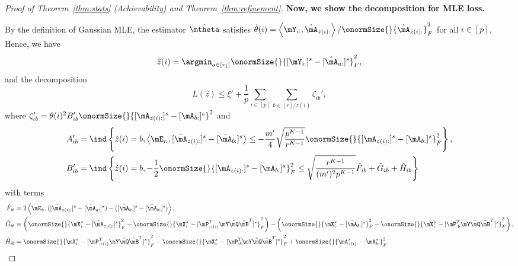 \documentclass[lettersize,onecolumn,journal]{IEEEtran}
\theoremstyle{definition}
\theoremstyle{definition}
\newcommand{\of}[1]{\left(#1\right)}
\newcommand{\offf}[1]{\left\{#1\right\}}
\newcommand{\ang}[1]{\left\langle#1\right\rangle}
\begin{document}
\begin{proof}[Proof of Theorem~\ref{thm:stats} (Achievability) and Theorem~\ref{thm:refinement}]
    {
    \color{blue}
    
    \textbf{Now, we show the decomposition for MLE loss.}
     
    By the definition of Gaussian MLE, the estimator $\hat \mtheta$ satisfies $\hat \theta(i)  = \ang{ \mY_{i:} , \hat \mA_{\hat z(i):} }/{\onormSize{}{ \hat \mA_{\hat z(i):}}_F^2}$ for all $i \in [p]$.
Hence, we have 
\begin{equation}
    \hat z(i) = \argmin_{a \in [r_1]} \onormSize{}{ [\mY_{ i:}]^s - [\hat \mA_{a:}]^s}_F^2,
\end{equation}
and the decomposition 
 \begin{equation}
        L(\hat z) \leq \xi' + \frac{1}{p}\sum_{i \in [p] }  \sum_{b \in [r]/z(i)}  \zeta_{ib}', 
    \end{equation}
    where $ \zeta_{ib}' =   \theta(i)^2 B_{ib}' \onormSize{}{ [ \mA_{ z(i):}  ]^s - [ \mA_{b:}  ]^s  }^2$ and 
    \begin{align}
        A'_{ib} &= \ind \offf{  \hat z(i)  = b,   \ang{\mE_{i:}, [\bar \mA_{z(i):}]^s - [\bar \mA_{b:}]^s }  \leq - \frac{m'}{4}  \sqrt{\frac{p^{K-1}}{r^{K-1}}} \onormSize{}{ [\mA_{z(i):}]^s -  [\mA_{b:}]^s  }_F^2 }, \\
    B'_{ib} &= \ind \offf{  \hat z(i)  = b,     - \frac{1}{2}  \onormSize{}{ [\mA_{z(i):}]^s -  [\mA_{b:}]^s  }_F^2  \leq \sqrt{\frac{r^{K-1}}{(m')^2 p^{K-1}}}  \hat F_{ib} + \hat G_{ib} + \hat H_{ib} }
    \end{align}
    with terms 
    \begin{align}
    \hat F_{ib} &= 2 \ang{ \mE_{i:}, ([\bar  \mA_{z(i):}]^s - [\hat \mA_{a:}]^s) - ([\bar  \mA_{b:}]^s - [\hat \mA_{b:}]^s) }, \\
    \hat G_{ib}& = \of{ \onormSize{}{\mX_{i:}^s - [\hat \mA_{z(i):}]^s}_F^2 - \onormSize{}{ \mX^s_{i:} - [\mP_{:z(i)}^T \mY \hat \mQ \hat \mB^T ]^s }_F^2  } - \of{ \onormSize{}{\mX^s_{i:} - [\hat \mA_{b:}]^s}_F^2 - \onormSize{}{ \mX^s_{i:} - [\mP_{:b}^T \mY \hat \mQ \hat \mB^T]^s }_F^2   }, \\
   \hat  H_{ib}& = \onormSize{}{ \mX^s_{i:} - [\mP_{:z(i)}^T \mY \hat \mQ \hat \mB^T]^s }_F^2 - \onormSize{}{ \mX^s_{i:} - [\mP_{:b}^T \mY \hat \mQ \hat \mB^T]^s }_F^2 + \onormSize{}{ \mA^s_{z(i):} -  \mA^s_{b:}  }_F^2.
\end{align}
    
    }
   



\end{proof}
\end{document}
